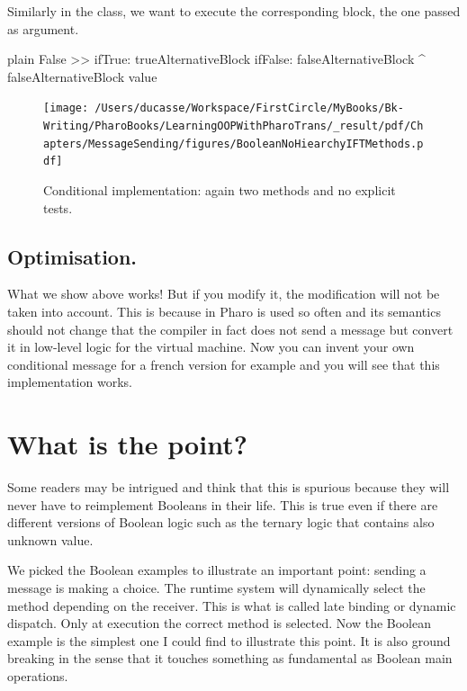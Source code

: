 \documentclass[10pt,twoside,english]{_support/latex/sbabook/sbabook}
\begin{document}
Similarly in the  class, we want to execute the corresponding block, 
the one passed as  argument. 

\begin{displaycode}{plain}
False >> ifTrue: trueAlternativeBlock ifFalse: falseAlternativeBlock
   ^ falseAlternativeBlock value
\end{displaycode}


\begin{figure}

\begin{center}
\texttt{[image: /Users/ducasse/Workspace/FirstCircle/MyBooks/Bk-Writing/PharoBooks/LearningOOPWithPharoTrans/\_result/pdf/Chapters/MessageSending/figures/BooleanNoHiearchyIFTMethods.pdf]}\caption{Conditional implementation: again two methods and no explicit tests.\label{figFT}}\end{center}
\end{figure}

\subsection{Optimisation. }
What we show above works! But if you modify it, the modification will not be taken into account. 
This is because in Pharo  is used so often and its semantics should not change that the compiler in fact does not send a message but convert it in low-level logic for the virtual machine. 
Now you can invent your own conditional message  for a french version for example and you will see that this implementation works.
\section{What is the point?}
Some readers may be intrigued and think that this is spurious because they will never have to reimplement Booleans in their life. This is true even if there are different versions of Boolean logic such as the ternary logic that contains also unknown value. 

We picked the Boolean examples to illustrate an important point: sending a message is making a choice. The runtime system will dynamically select the method depending on the receiver. This is what is called late binding or dynamic dispatch. Only at execution the correct method is selected. Now the Boolean example is the simplest one I could find to illustrate this point. 
It is also ground breaking in the sense that it touches something as fundamental as Boolean main operations. 
\end{document}
